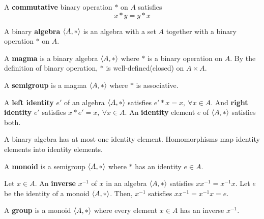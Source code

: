 \begin{definition}
	A \textbf{commutative} binary operation $\ast$ on $A$ satisfies
	\begin{equation}
		x \ast y = y \ast x
	\end{equation}
\end{definition}

\begin{definition}
	A binary \textbf{algebra} $\left\langle A,\ast \right\rangle$ is an algebra with a set $A$ together with a binary operation $\ast$ on $A$.
\end{definition}

\begin{definition}
	A \textbf{magma} is a binary algebra $\left\langle A,\ast \right\rangle$ where $\ast$ is a binary operation on $A$.
	By the definition of binary operation, $\ast$ is well-defined(closed) on $A \times A$.
\end{definition}

\begin{definition}
	A \textbf{semigroup} is a magma $\left\langle A,\ast \right\rangle$ where $\ast$ is associative.
\end{definition}

\begin{definition}
	A \textbf{left identity} $e'$ of an algebra $\left\langle A,\ast \right\rangle$ satisfies $e' \ast x = x,\ \forall x \in A$.
	And \textbf{right identity} $e'$ satisfies $x \ast e' = x,\ \forall x \in A$.
	An \textbf{identity} element $e$ of $\left\langle A,\ast \right\rangle$ satisfies both.
\end{definition}
	A binary algebra has at most one identity element.
	Homomorphisms map identity elements into identity elements.

\begin{definition}
	A \textbf{monoid} is a semigroup $\left\langle A,\ast \right\rangle$ where $\ast$ has an identity $e \in A$.
\end{definition}

\begin{definition}
	Let $x \in A$.
	An \textbf{inverse} $x^{-1}$ of $x$ in an algebra $\left\langle A,\ast \right\rangle$ satisfies $xx^{-1} = x^{-1}x$.
	Let $e$ be the identity of a monoid $\left\langle A,\ast \right\rangle$.
	Then, $x^{-1}$ satisfies $xx^{-1} = x^{-1}x = e$.
\end{definition}

\begin{definition}
	A \textbf{group} is a monoid $\left\langle A,\ast \right\rangle$ where every element $x \in A$ has an inverse $x^{-1}$.
\end{definition}


